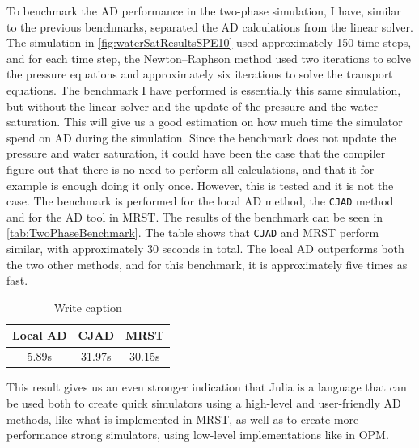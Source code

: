 To benchmark the AD performance in the two-phase simulation, I have, similar to the previous benchmarks, separated the AD calculations from the linear solver. The simulation in \autoref{fig:waterSatResultsSPE10} used approximately 150 time steps, and for each time step, the Newton--Raphson method used two iterations to solve the pressure equations and approximately six iterations to solve the transport equations. The benchmark I have performed is essentially this same simulation, but without the linear solver and the update of the pressure and the water saturation. This will give us a good estimation on how much time the simulator spend on AD during the simulation. Since the benchmark does not update the pressure and water saturation, it could have been the case that the compiler figure out that there is no need to perform all calculations, and that it for example is enough doing it only once. However, this is tested and it is not the case. The benchmark is performed for the local AD method, the \texttt{CJAD} method and for the AD tool in MRST. The results of the benchmark can be seen in \autoref{tab:TwoPhaseBenchmark}. The table shows that \texttt{CJAD} and MRST perform similar, with approximately 30 seconds in total. The local AD outperforms both the two other methods, and for this benchmark, it is approximately five times as fast.
\begin{table}[htb]
    \centering
    \caption{Write caption}
    \label{tab:TwoPhaseBenchmark}
    \def\arraystretch{1.5}
    \begin{tabular}{ccc}
    \textbf{Local AD} & \textbf{CJAD} & \textbf{MRST}\\
        \hline
        5.89s & 31.97s & 30.15s \\  
        \hline
    \end{tabular}
\end{table}
This result gives us an even stronger indication that Julia is a language that can be used both to create quick simulators using a high-level and user-friendly AD methods, like what is implemented in MRST, as well as to create more performance strong simulators, using low-level implementations like in OPM.